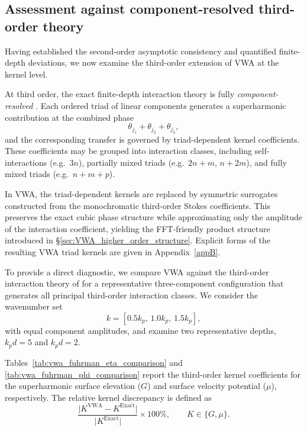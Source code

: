\documentclass[lineno]{JFM-FLM_Au}
\begin{document}

\subsection{Assessment against component-resolved third-order theory}
\label{method:3rd_kernel_comparison}

Having established the second-order asymptotic consistency and quantified finite-depth deviations, we now examine the third-order extension of VWA at the kernel level.

At third order, the exact finite-depth interaction theory is fully \emph{component-resolved} \citep{madsen2012third}. Each ordered triad of linear components generates a superharmonic contribution at the combined phase 
\[
\theta_{j_1}+\theta_{j_2}+\theta_{j_3},
\]
and the corresponding transfer is governed by triad-dependent kernel coefficients. 
These coefficients may be grouped into interaction classes, including self-interactions (e.g.\ $3n$), partially mixed triads (e.g.\ $2n+m$, $n+2m$), and fully mixed triads (e.g.\ $n+m+p$).

In VWA, the triad-dependent kernels are replaced by symmetric surrogates constructed from the monochromatic third-order Stokes coefficients. 
This preserves the exact cubic phase structure while approximating only the amplitude of the interaction coefficient, yielding the FFT-friendly product structure introduced in \S\ref{sec:VWA_higher_order_structure}. 
Explicit forms of the resulting VWA triad kernels are given in Appendix~\ref{appB}.


To provide a direct diagnostic, we compare VWA against the third-order interaction theory of \citet{madsen2012third} for a representative three-component configuration that generates all principal third-order interaction classes. 
We consider the wavenumber set
\[
k=[0.5k_p,\,1.0k_p,\,1.5k_p],
\]
with equal component amplitudes, and examine two representative depths, $k_p d=5$ and $k_p d=2$.

Tables~\ref{tab:vwa_fuhrman_eta_comparison} and \ref{tab:vwa_fuhrman_phi_comparison} report the third-order kernel coefficients for the superharmonic surface elevation ($G$) and surface velocity potential ($\mu$), respectively. 
The relative kernel discrepancy is defined as
\[
\frac{\lvert K^{\mathrm{VWA}}-K^{\mathrm{Exact}}\rvert}
{\lvert K^{\mathrm{Exact}}\rvert}\times 100\%,
\qquad K\in\{G,\mu\}.
\]
\end{document}
